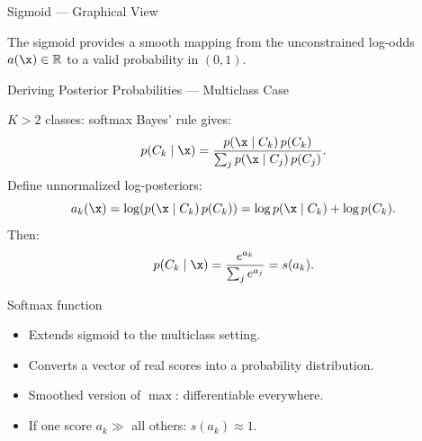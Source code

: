 \begin{frame}{Sigmoid — Graphical View}
  \begin{center}
  \end{center}
  \vspace{-2mm}
  {\small The sigmoid provides a smooth mapping from the unconstrained log-odds
  $a(\x)\in\mathbb{R}$ to a valid probability in $(0,1)$.}
\end{frame}

\begin{frame}{Deriving Posterior Probabilities — Multiclass Case}
  \begin{block}{$K>2$ classes: softmax}
    Bayes' rule gives:
    \[
      p(C_k\mid\x)=\frac{p(\x\mid C_k)\,p(C_k)}{\sum_j p(\x\mid C_j)\,p(C_j)}.
    \]
    Define unnormalized log-posteriors:
    \[
      a_k(\x)=\log(p(\x\mid C_k)\,p(C_k))=\log p(\x\mid C_k)+\log p(C_k).
    \]
    Then:
    \[
      p(C_k\mid\x)=\frac{e^{a_k}}{\sum_j e^{a_j}}=s(a_k).
    \]
  \end{block}

  \begin{block}{Softmax function}
    \begin{itemize}
      \item Extends sigmoid to the multiclass setting.
      \item Converts a vector of real scores into a probability distribution.
      \item Smoothed version of $\max$: differentiable everywhere.
      \item If one score $a_k\gg$ all others: $s(a_k)\approx 1$.
    \end{itemize}
  \end{block}
\end{frame}

